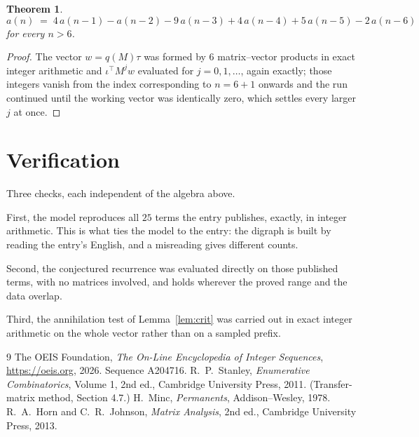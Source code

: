 \documentclass[11pt,a4paper]{article}
\theoremstyle{plain}
\newtheorem{theorem}{Theorem}
\theoremstyle{definition}
\begin{document}
\begin{theorem}
\[
a(n)\;=\;4\,a(n-1) - a(n-2) - 9\,a(n-3) + 4\,a(n-4) + 5\,a(n-5) - 2\,a(n-6)
\]
for every $n>6$.
\end{theorem}

\begin{proof}
The vector $w=q(M)\tau$ was formed by $6$ matrix--vector products in exact integer
arithmetic and $\iota^{\!\top}M^{j}w$ evaluated for $j=0,1,\dots$, again exactly; those
integers vanish from the index corresponding to $n=6+1$ onwards and the run continued
until the working vector was identically zero, which settles every larger $j$ at once.
\end{proof}

\section{Verification}

Three checks, each independent of the algebra above.

First, the model reproduces all $25$ terms the entry publishes, exactly, in integer
arithmetic. This is what ties the model to the entry: the digraph is built by reading the
entry's English, and a misreading gives different counts.

Second, the conjectured recurrence was evaluated directly on those published terms, with no
matrices involved, and holds wherever the proved range and the data overlap.

Third, the annihilation test of Lemma~\ref{lem:crit} was carried out in exact integer
arithmetic on the whole vector rather than on a sampled prefix.

\begin{thebibliography}{9}
 The OEIS Foundation, \emph{The On-Line Encyclopedia of Integer
Sequences}, \url{https://oeis.org}, 2026. Sequence A204716.
 R.~P.~Stanley, \emph{Enumerative Combinatorics}, Volume 1, 2nd ed.,
Cambridge University Press, 2011. (Transfer-matrix method, Section 4.7.)
 H.~Minc, \emph{Permanents}, Addison--Wesley, 1978.
 R.~A.~Horn and C.~R.~Johnson, \emph{Matrix Analysis}, 2nd ed., Cambridge
University Press, 2013.
\end{thebibliography}
\end{document}
